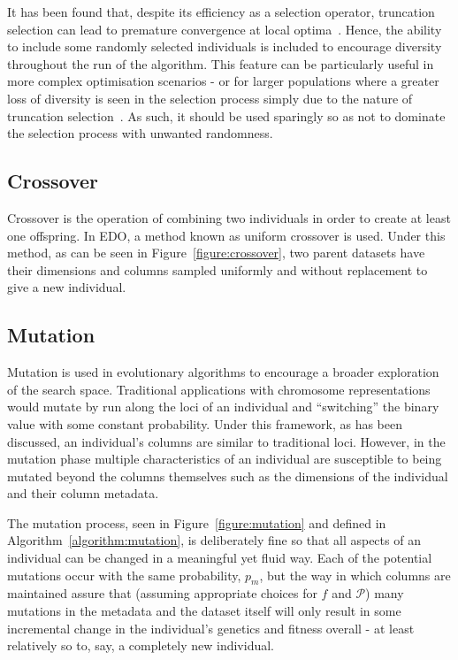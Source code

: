 

It has been found that, despite its efficiency as a selection
operator, truncation selection can lead to premature convergence at local
optima~\cite{Jebari2013}. Hence, the ability to include some randomly selected
individuals is included to encourage diversity throughout the run of the
algorithm. This feature can be particularly useful in more complex optimisation
scenarios \-- or for larger populations where a greater loss of diversity is
seen in the selection process simply due to the nature of truncation
selection~\cite{Tatsuya2002}. As such, it should be used sparingly so as not to
dominate the selection process with unwanted randomness.

\subsection{Crossover}

Crossover is the operation of combining two individuals in order to create at
least one offspring. In EDO, a method known as uniform crossover is used. Under
this method, as can be seen in Figure~\ref{figure:crossover}, two parent
datasets have their dimensions and columns sampled uniformly and without
replacement to give a new individual.



\subsection{Mutation}

Mutation is used in evolutionary algorithms to encourage a broader exploration
of the search space. Traditional applications with chromosome representations
would mutate by run along the loci of an individual and ``switching'' the binary
value with some constant probability. Under this framework, as has been
discussed, an individual's columns are similar to traditional loci. However, in
the mutation phase multiple characteristics of an individual are susceptible to
being mutated beyond the columns themselves such as the dimensions of the
individual and their column metadata.


The mutation process, seen in Figure~\ref{figure:mutation} and defined in
Algorithm~\ref{algorithm:mutation},
is deliberately fine so that all aspects of an individual can be changed in a
meaningful yet fluid way. Each of the potential mutations occur with the same
probability, \(p_m\), but the way in which columns are maintained assure that
(assuming appropriate choices for \(f\) and \(\mathcal{P}\)) many mutations in
the metadata and the dataset itself will only result in some incremental change
in the individual's genetics and fitness overall \-- at least relatively so to,
say, a completely new individual.

